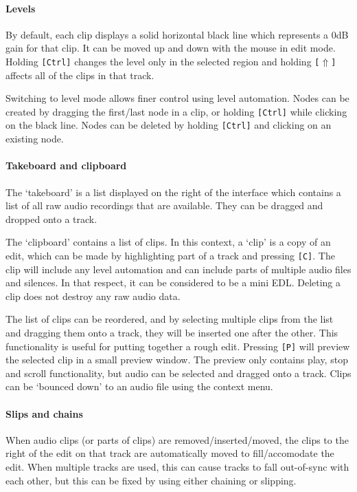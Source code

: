 \paragraph{Levels}
By default, each clip displays a solid horizontal black line which represents a
0dB gain for that clip. It can be moved up and down with the mouse in edit
mode. Holding \texttt{[Ctrl]} changes the level only in the selected region and
holding \texttt{[$\Uparrow$]} affects all of the clips in that track.

Switching to level mode allows finer control using level automation. Nodes can
be created by dragging the first/last node in a clip, or holding
\texttt{[Ctrl]} while clicking on the black line. Nodes can be deleted by
holding \texttt{[Ctrl]} and clicking on an existing node.

\paragraph{Takeboard and clipboard}
The `takeboard' is a list displayed on the right of the interface which
contains a list of all raw audio recordings that are available. They can be
dragged and dropped onto a track.

The `clipboard' contains a list of clips. In this context, a `clip' is a copy
of an edit, which can be made by highlighting part of a track and pressing
\texttt{[C]}. The clip will include any level automation and can include parts
of multiple audio files and silences. In that respect, it can be considered to
be a mini EDL. Deleting a clip does not destroy any raw audio data.

The list of clips can be reordered, and by selecting multiple clips from the
list and dragging them onto a track, they will be inserted one after the other.
This functionality is useful for putting together a rough edit.  Pressing
\texttt{[P]} will preview the selected clip in a small preview window. The
preview only contains play, stop and scroll functionality, but audio can be
selected and dragged onto a track. Clips can be `bounced down' to an audio file
using the context menu.

\paragraph{Slips and chains}
When audio clips (or parts of clips) are removed\slash inserted\slash moved,
the clips to the right of the edit on that track are automatically moved to
fill/accomodate the edit. When multiple tracks are used, this can cause tracks
to fall out-of-sync with each other, but this can be fixed by using either
chaining or slipping.

